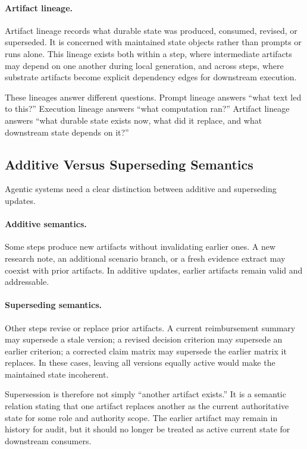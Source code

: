\documentclass{article}
\begin{document}
\paragraph{Artifact lineage.} Artifact lineage records what durable state was produced, consumed, revised, or superseded. It is concerned with maintained state objects rather than prompts or runs alone. This lineage exists both within a step, where intermediate artifacts may depend on one another during local generation, and across steps, where substrate artifacts become explicit dependency edges for downstream execution.

These lineages answer different questions. Prompt lineage answers ``what text led to this?'' Execution lineage answers ``what computation ran?'' Artifact lineage answers ``what durable state exists now, what did it replace, and what downstream state depends on it?''

\subsection{Additive Versus Superseding Semantics}

Agentic systems need a clear distinction between additive and superseding updates.

\paragraph{Additive semantics.} Some steps produce new artifacts without invalidating earlier ones. A new research note, an additional scenario branch, or a fresh evidence extract may coexist with prior artifacts. In additive updates, earlier artifacts remain valid and addressable.

\paragraph{Superseding semantics.} Other steps revise or replace prior artifacts. A current reimbursement summary may supersede a stale version; a revised decision criterion may supersede an earlier criterion; a corrected claim matrix may supersede the earlier matrix it replaces. In these cases, leaving all versions equally active would make the maintained state incoherent.

Supersession is therefore not simply ``another artifact exists.'' It is a semantic relation stating that one artifact replaces another as the current authoritative state for some role and authority scope. The earlier artifact may remain in history for audit, but it should no longer be treated as active current state for downstream consumers.
\end{document}
